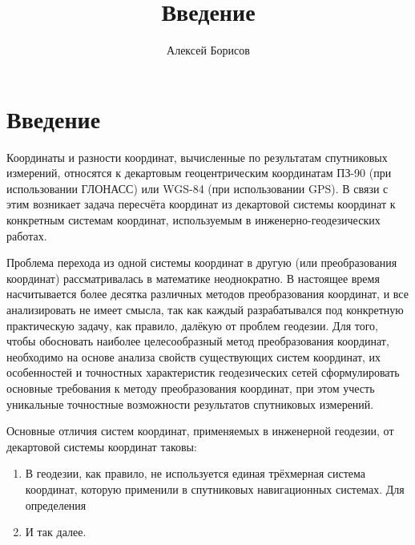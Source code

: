 \documentclass[12pt]{book}
\title{Введение}
\author{Алексей Борисов}
\begin{document}
\chapter*{Введение}
\par
Координаты и разности координат, вычисленные по результатам спутниковых измерений, относятся к декартовым геоцентрическим координатам ПЗ-90 (при использовании ГЛОНАСС) или WGS-84 (при использовании GPS). В связи с этим возникает задача пересчёта координат из декартовой системы координат к конкретным системам координат, используемым в инженерно-геодезических работах.
\par
Проблема перехода из одной системы координат в другую (или преобразования координат) рассматривалась в математике неоднократно. В настоящее время насчитывается более десятка различных методов преобразования координат, и все анализировать не имеет смысла, так как каждый разрабатывался под конкретную практическую задачу, как правило, далёкую от проблем геодезии. Для того, чтобы обосновать наиболее целесообразный метод преобразования координат, необходимо на основе анализа свойств существующих систем координат, их особенностей и точностных характеристик геодезических сетей сформулировать основные требования к методу преобразования координат, при этом учесть уникальные точностные возможности результатов спутниковых измерений.
\par
Основные отличия систем координат, применяемых в инженерной геодезии, от декартовой системы координат таковы:
\begin{enumerate}
\item В геодезии, как правило, не используется единая трёхмерная система координат, которую применили в спутниковых навигационных системах. Для определения
\item И так далее.
\end{enumerate}
\end{document}
